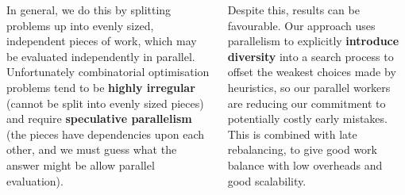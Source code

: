 \documentclass[20pt,a1paper,landscape]{tikzposter}
\begin{document}
\begin{columns}
{    \medskip

    In general, we do this by splitting problems up into evenly sized, independent pieces of work,
    which may be evaluated independently in parallel. Unfortunately combinatorial optimisation
    problems tend to be \textbf{highly irregular} (cannot be split into evenly sized pieces) and
    require \textbf{speculative parallelism} (the pieces have dependencies upon each other, and we
    must guess what the answer might be allow parallel evaluation).

    \medskip

    Despite this, results can be favourable. Our approach uses parallelism to explicitly
    \textbf{introduce diversity} into a search process to offset the weakest choices made by
    heuristics, so our parallel workers are reducing our commitment to potentially costly early
    mistakes. This is combined with late rebalancing, to give good work balance with low overheads
    and good scalability.
}


\end{columns}
\end{document}
